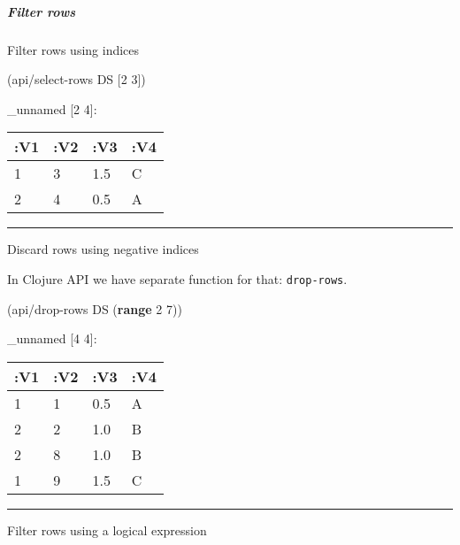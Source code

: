 \documentclass[]{article}
\newenvironment{Shaded}{\begin{snugshade}}{\end{snugshade}}
\newcommand{\AttributeTok}[1]{\textcolor[rgb]{0.77,0.63,0.00}{#1}}
\newcommand{\DecValTok}[1]{\textcolor[rgb]{0.00,0.00,0.81}{#1}}
\newcommand{\KeywordTok}[1]{\textcolor[rgb]{0.13,0.29,0.53}{\textbf{#1}}}
\newcommand{\NormalTok}[1]{#1}
\newcommand{\VariableTok}[1]{\textcolor[rgb]{0.00,0.00,0.00}{#1}}
\let\oldsubparagraph\subparagraph
\renewcommand{\subparagraph}[1]{\oldsubparagraph{#1}\mbox{}}
\begin{document}
\hypertarget{filter-rows}{%
\subparagraph{Filter rows}\label{filter-rows}}

Filter rows using indices

\begin{Shaded}
\begin{Highlighting}[]
\NormalTok{(api/select-rows DS [}\DecValTok{2} \DecValTok{3}\NormalTok{])}
\end{Highlighting}
\end{Shaded}

\_unnamed {[}2 4{]}:

\begin{longtable}[]{@{}llll@{}}
\toprule
:V1 & :V2 & :V3 & :V4\tabularnewline
\midrule
\endhead
1 & 3 & 1.5 & C\tabularnewline
2 & 4 & 0.5 & A\tabularnewline
\bottomrule
\end{longtable}

\begin{center}\rule{0.5\linewidth}{0.5pt}\end{center}

Discard rows using negative indices

In Clojure API we have separate function for that: \texttt{drop-rows}.

\begin{Shaded}
\begin{Highlighting}[]
\NormalTok{(api/drop-rows DS (}\KeywordTok{range} \DecValTok{2} \DecValTok{7}\NormalTok{))}
\end{Highlighting}
\end{Shaded}

\_unnamed {[}4 4{]}:

\begin{longtable}[]{@{}llll@{}}
\toprule
:V1 & :V2 & :V3 & :V4\tabularnewline
\midrule
\endhead
1 & 1 & 0.5 & A\tabularnewline
2 & 2 & 1.0 & B\tabularnewline
2 & 8 & 1.0 & B\tabularnewline
1 & 9 & 1.5 & C\tabularnewline
\bottomrule
\end{longtable}

\begin{center}\rule{0.5\linewidth}{0.5pt}\end{center}

Filter rows using a logical expression

\begin{Shaded}
\end{Shaded}
\end{document}
